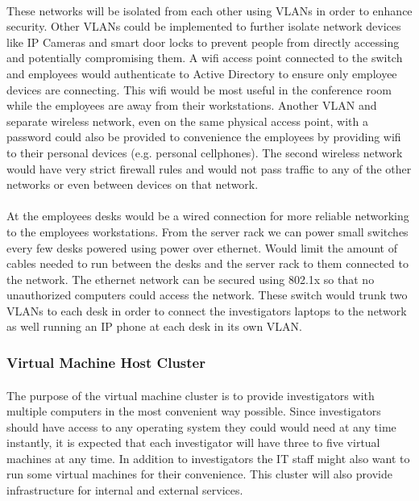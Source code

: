 \documentclass{article}
\begin{document}
\paragraph{}
These networks will be isolated from each other using VLANs in order to enhance security.
Other VLANs could be implemented to further isolate network devices like IP Cameras and smart door locks to prevent people from directly accessing and potentially compromising them.
A wifi access point connected to the switch and employees would authenticate to Active Directory to ensure only employee devices are connecting.
This wifi would be most useful in the conference room while the employees are away from their workstations.
Another VLAN and separate wireless network, even on the same physical access point, with a password could also be provided to convenience the employees by providing wifi to their personal devices (e.g. personal cellphones).
The second wireless network would have very strict firewall rules and would not pass traffic to any of the other networks or even between devices on that network.
\paragraph{}
At the employees desks would be a wired connection for more reliable networking to the employees workstations. 
From the server rack we can power small switches every few desks powered using power over ethernet.
Would limit the amount of cables needed to run between the desks and the server rack to them connected to the network.
The ethernet network can be secured using 802.1x so that no unauthorized computers could access the network. 
These switch would trunk two VLANs to each desk in order to connect the investigators laptops to the network as well running an IP phone at each desk in its own VLAN.

\subsubsection{Virtual Machine Host Cluster}
\paragraph{}
The purpose of the virtual machine cluster is to provide investigators with multiple computers in the most convenient way possible.
Since investigators should have access to any operating system they could would need at any time instantly, it is expected that each investigator will have three to five virtual machines at any time.
In addition to investigators the IT staff might also want to run some virtual machines for their convenience.
This cluster will also provide infrastructure for internal and external services.
\end{document}
